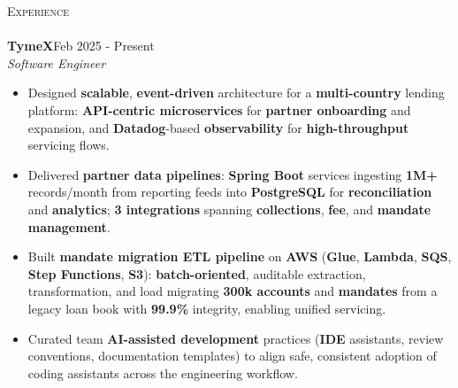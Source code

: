 \documentclass[a4paper]{article}
\newcommand{\lineunder} {
 \vspace*{-8pt} \\
 \hspace*{-18pt} \hrulefill \\
}
\newcommand{\header} [1] {
 {\hspace*{-18pt}\vspace*{6pt} \textsc{#1}}
 \vspace*{-6pt} \lineunder
}
\begin{document}
\header{Experience}
\vspace{-1mm}
{\textbf{TymeX}}\hfill Feb 2025 - Present \\
{\textit{Software Engineer}} \
\vspace{-2mm}
\begin{itemize}
      \item Designed \textbf{scalable}, \textbf{event-driven} architecture for a \textbf{multi-country} lending platform: \textbf{API-centric microservices} for \textbf{partner onboarding} and expansion, and \textbf{Datadog}-based \textbf{observability} for \textbf{high-throughput} servicing flows.
            \vspace{-2.5mm}
      \item Delivered \textbf{partner data pipelines}: \textbf{Spring Boot} services ingesting \textbf{1M+} records/month from reporting feeds into \textbf{PostgreSQL} for \textbf{reconciliation} and \textbf{analytics}; \textbf{3 integrations} spanning \textbf{collections}, \textbf{fee}, and \textbf{mandate management}.
            \vspace{-2.5mm}
      \item Built \textbf{mandate migration ETL pipeline} on \textbf{AWS} (\textbf{Glue}, \textbf{Lambda}, \textbf{SQS}, \textbf{Step Functions}, \textbf{S3}): \textbf{batch-oriented}, auditable extraction, transformation, and load migrating \textbf{300k accounts} and \textbf{mandates} from a legacy loan book with \textbf{99.9\%} integrity, enabling unified servicing.
            \vspace{-2.5mm}
      \item Curated team \textbf{AI-assisted development} practices (\textbf{IDE} assistants, review conventions, documentation templates) to align safe, consistent adoption of coding assistants across the engineering workflow.
\end{itemize}
\vspace{-1.5mm}
\end{document}
